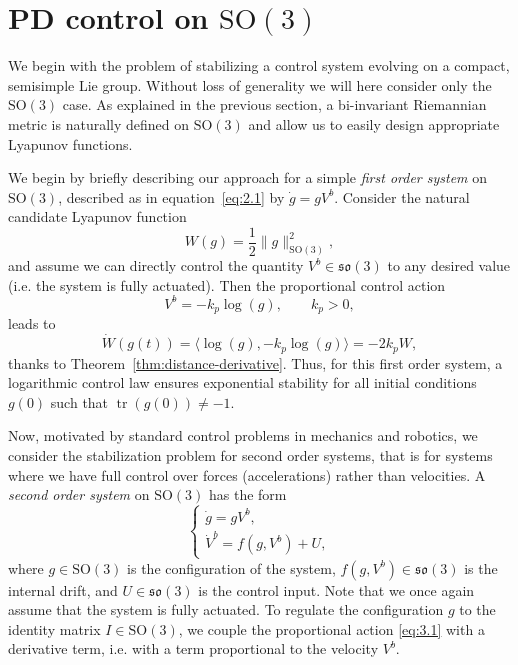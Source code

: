 \documentclass[11pt]{article}
\newcommand{\SO}{\mathrm{SO}}
\newcommand{\so}{\mathfrak{so}}
\newcommand{\tr}{\operatorname{tr}}
\begin{document}
\section{PD control on $\SO(3)$}\label{sec:pd-so3}
We begin with the problem of stabilizing a control system evolving on a compact, semisimple Lie group. Without loss of generality we will here consider only the $\SO(3)$ case. As explained in the previous section, a bi-invariant Riemannian metric is naturally defined on $\SO(3)$ and allow us to easily design appropriate Lyapunov functions.


We begin by briefly describing our approach for a simple \emph{first order system} on $\SO(3)$, described as in equation~\eqref{eq:2.1} by $\dot g=gV^b$. Consider the natural candidate Lyapunov function
\begin{equation*}
W(g)=\frac12\|g\|_{\SO(3)}^2,
\end{equation*}
and assume we can directly control the quantity $V^b\in\so(3)$ to any desired value (i.e. the system is fully actuated). Then the proportional control action
\begin{equation*}
V^b=-k_p\log(g),\qquad k_p>0,\tag{3.1}\label{eq:3.1}
\end{equation*}
leads to
\begin{equation*}
\dot W(g(t))=\langle\log(g),-k_p\log(g)\rangle=-2k_pW,
\end{equation*}
thanks to Theorem~\ref{thm:distance-derivative}. Thus, for this first order system, a logarithmic control law ensures exponential stability for all initial conditions $g(0)$ such that $\tr(g(0))\neq-1$.

Now, motivated by standard control problems in mechanics and robotics, we consider the stabilization problem for second order systems, that is for systems where we have full control over forces (accelerations) rather than velocities. A \emph{second order system} on $\SO(3)$ has the form
\begin{equation*}
\begin{cases}
\dot g=gV^b,\\
\dot V^b=f(g,V^b)+U,
\end{cases}\tag{3.2}\label{eq:3.2}
\end{equation*}
where $g\in\SO(3)$ is the configuration of the system, $f(g,V^b)\in\so(3)$ is the internal drift, and $U\in\so(3)$ is the control input. Note that we once again assume that the system is fully actuated. To regulate the configuration $g$ to the identity matrix $I\in\SO(3)$, we couple the proportional action \eqref{eq:3.1} with a derivative term, i.e. with a term proportional to the velocity $V^b$.
\end{document}
